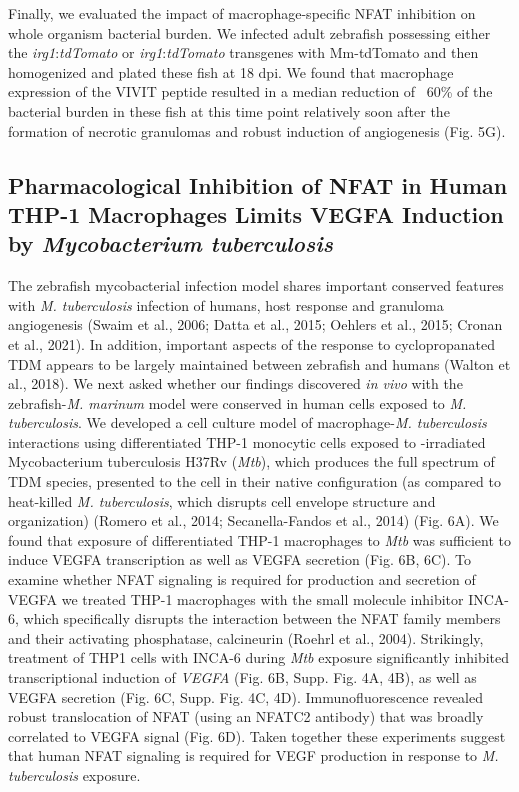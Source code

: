 Finally, we evaluated the impact of macrophage-specific NFAT inhibition on whole organism bacterial burden. We infected adult zebrafish possessing either the \textit{irg1}:\textit{tdTomato} or \textit{irg1}:\textit{tdTomato} transgenes with Mm-tdTomato and then homogenized and plated these fish at 18 dpi. We found that macrophage expression of the VIVIT peptide resulted in a median reduction of ~60\% of the bacterial burden in these fish at this time point relatively soon after the formation of necrotic granulomas and robust induction of angiogenesis (Fig. 5G).
 
\subsection{Pharmacological Inhibition of NFAT in Human \mbox{THP-1} Macrophages Limits VEGFA Induction by \textit{Mycobacterium tuberculosis}}

The zebrafish mycobacterial infection model shares important conserved features with \textit{M. tuberculosis} infection of humans, host response and granuloma angiogenesis (Swaim et al., 2006; Datta et al., 2015; Oehlers et al., 2015; Cronan et al., 2021). In addition, important aspects of the response to cyclopropanated TDM appears to be largely maintained between zebrafish and humans (Walton et al., 2018). We next asked whether our findings discovered \textit{in vivo} with the zebrafish-\textit{M. marinum} model were conserved in human cells exposed to \textit{M. tuberculosis}. We developed a cell culture model of macrophage-\textit{M. tuberculosis} interactions using differentiated THP-1 monocytic cells exposed to \textgamma-irradiated Mycobacterium tuberculosis H37Rv (\textgamma\textit{Mtb}), which produces the full spectrum of TDM species, presented to the cell in their native configuration (as compared to heat-killed \textit{M. tuberculosis}, which disrupts cell envelope structure and organization) (Romero et al., 2014; Secanella-Fandos et al., 2014) (Fig. 6A). We found that exposure of differentiated THP-1 macrophages to \textgamma\textit{Mtb} was sufficient to induce VEGFA transcription as well as VEGFA secretion (Fig. 6B, 6C). To examine whether NFAT signaling is required for production and secretion of VEGFA we treated THP-1 macrophages with the small molecule inhibitor INCA-6, which specifically disrupts the interaction between the NFAT family members and their activating phosphatase, calcineurin (Roehrl et al., 2004). Strikingly, treatment of THP1 cells with INCA-6 during \textgamma\textit{Mtb} exposure significantly inhibited transcriptional induction of \textit{VEGFA} (Fig. 6B, Supp. Fig. 4A, 4B), as well as VEGFA secretion (Fig. 6C, Supp. Fig. 4C, 4D). Immunofluorescence revealed robust translocation of NFAT (using an NFATC2 antibody) that was broadly correlated to VEGFA signal (Fig. 6D). Taken together these experiments suggest that human NFAT signaling is required for VEGF production in response to \textit{M. tuberculosis} exposure.

